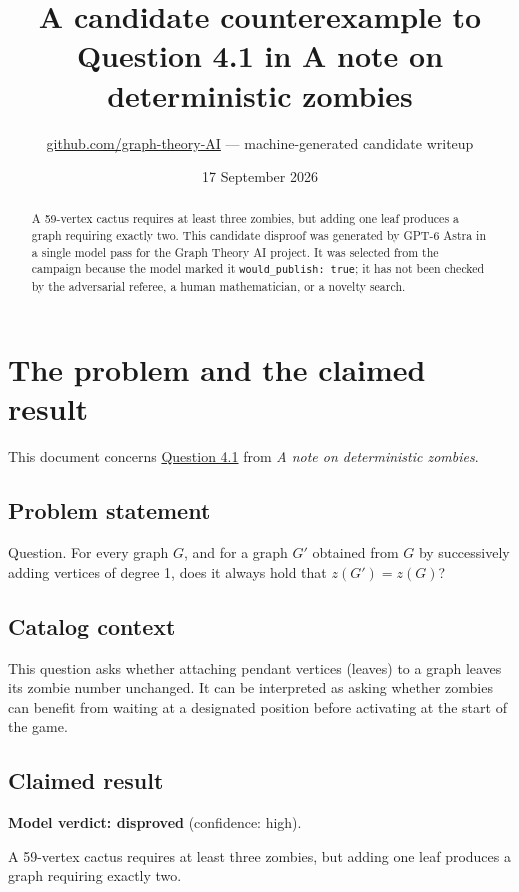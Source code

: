 \documentclass[
  11pt,
  a4paper,
]{article}
\title{A candidate counterexample to Question 4.1 in A note on
deterministic zombies}
\author{\href{https://github.com/graph-theory-AI}{github.com/graph-theory-AI}
--- machine-generated candidate writeup}
\date{17 September 2026}
\begin{document}
\maketitle
\begin{abstract}
A 59-vertex cactus requires at least three zombies, but adding one leaf
produces a graph requiring exactly two. This candidate disproof was
generated by GPT-6 Astra in a single model pass for the Graph Theory AI
project. It was selected from the campaign because the model marked it
\texttt{would\_publish:\ true}; it has not been checked by the
adversarial referee, a human mathematician, or a novelty search.
\end{abstract}

\section{The problem and the claimed
result}\label{the-problem-and-the-claimed-result}

This document concerns
\href{https://graph-theory-ai.github.io/graph-conjectures/arxiv/2008.03587__00/}{Question
4.1} from \emph{A note on deterministic zombies}.

\subsection{Problem statement}\label{problem-statement}

Question. For every graph \(G\), and for a graph \(G'\) obtained from
\(G\) by successively adding vertices of degree 1, does it always hold
that \(z(G') = z(G)\)?

\subsection{Catalog context}\label{catalog-context}

This question asks whether attaching pendant vertices (leaves) to a
graph leaves its zombie number unchanged. It can be interpreted as
asking whether zombies can benefit from waiting at a designated position
before activating at the start of the game.

\subsection{Claimed result}\label{claimed-result}

\textbf{Model verdict: disproved} (confidence: high).

A 59-vertex cactus requires at least three zombies, but adding one leaf
produces a graph requiring exactly two.
\end{document}
